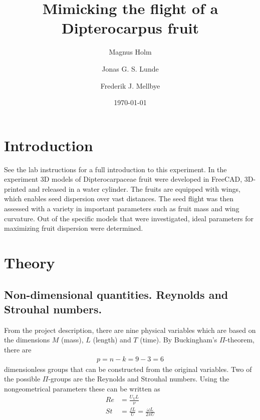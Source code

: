 \documentclass[aps,reprint]{revtex4-1}
\begin{document}
\title{Mimicking the flight of a Dipterocarpus fruit}
\author{Magnus Holm}
\author{Jonas G. S. Lunde}
\author{Frederik J. Mellbye}
\date{\today}

\maketitle

\section{Introduction}
\label{sec:introduction}
See the lab instructions for a full introduction to this experiment. In the experiment
3D models of Dipterocarpaceae fruit were developed in FreeCAD, 3D-printed and
released in a water cylinder. The fruits are equipped with wings, which enables
seed dispersion over vast distances. The seed flight was then assessed with a
variety in important parameters such as fruit mass and wing curvature. Out of the
specific models that were investigated, ideal parameters for maximizing fruit
dispersion were determined.

\section{Theory}
\label{sec:theory}
\subsection{Non-dimensional quantities. Reynolds and Strouhal numbers.}
From the project description, there are nine physical variables which are based
on the dimensions $M$ (mass), $L$ (length) and $T$ (time). By Buckingham's
$\Pi$-theorem, there are
\begin{align*}
  p = n - k = 9 - 3 = 6
\end{align*}
dimensionless groups that can be constructed from the original variables.
Two of the possible $\Pi$-groups are the Reynolds and Strouhal numbers. Using
the nongeometrical parameters these can be written as
\begin{align}
  Re &= \frac{U_V L}{\nu}\\
  St &= \frac{fL}{U} = \frac{\omega L}{2\pi U}
\end{align}
\end{document}
